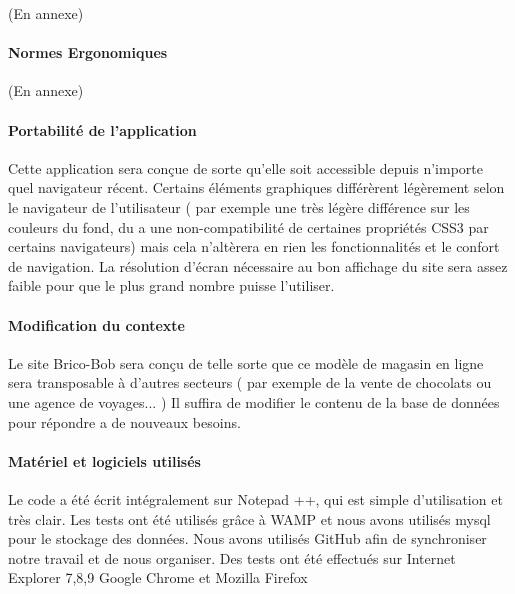 (En annexe)

\paragraph{Normes Ergonomiques}
	
(En annexe)

\paragraph{Portabilité de l'application}
	
Cette application sera conçue de sorte qu'elle soit accessible depuis n'importe quel navigateur récent. Certains éléments graphiques différèrent légèrement selon le navigateur de l'utilisateur ( par exemple une très légère différence sur les couleurs du fond, du a une non-compatibilité de certaines propriétés CSS3 par certains navigateurs) mais cela n'altèrera en rien les fonctionnalités et le confort de navigation.
La résolution d'écran nécessaire au bon affichage du site sera assez faible pour que le plus grand nombre puisse l'utiliser.

\paragraph{Modification du contexte}
	
Le site Brico-Bob sera conçu de telle sorte que ce modèle de magasin en ligne sera transposable à d'autres secteurs ( par exemple de la vente de chocolats ou  une agence de voyages... ) Il suffira de modifier le contenu de la base de données pour répondre a de nouveaux besoins.

\paragraph{Matériel et logiciels utilisés}
	
Le code a été écrit intégralement sur Notepad ++, qui est simple d'utilisation et très clair.
Les tests ont été utilisés grâce à WAMP et nous avons utilisés mysql pour le stockage des données.
Nous avons utilisés GitHub afin de synchroniser notre travail et de nous organiser.
Des tests ont été effectués sur Internet Explorer 7,8,9 Google Chrome et Mozilla Firefox

